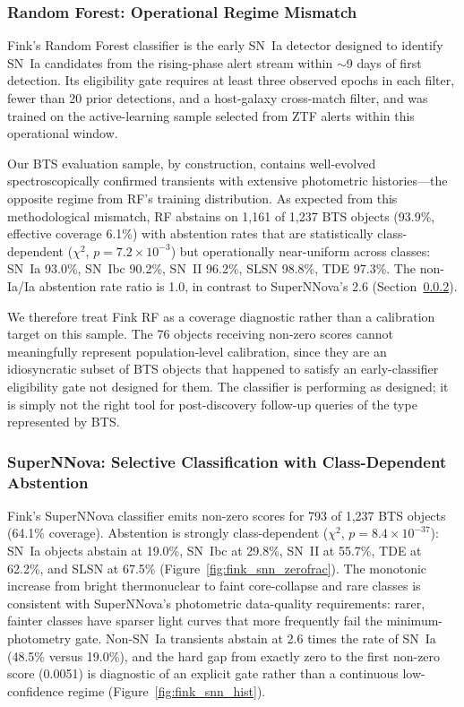 \documentclass[twocolumn]{aastex631}
\begin{document}
\subsubsection{Random Forest: Operational Regime Mismatch} \label{sec:fink_rf}

Fink's Random Forest classifier \citep{leoni2022} is the early SN~Ia detector designed to identify SN~Ia candidates from the rising-phase alert stream within $\sim$9 days of first detection. Its eligibility gate requires at least three observed epochs in each filter, fewer than 20 prior detections, and a host-galaxy cross-match filter, and was trained on the active-learning sample selected from ZTF alerts within this operational window.

Our BTS evaluation sample, by construction, contains well-evolved spectroscopically confirmed transients with extensive photometric histories---the opposite regime from RF's training distribution. As expected from this methodological mismatch, RF abstains on 1,161 of 1,237 BTS objects (93.9\%, effective coverage 6.1\%) with abstention rates that are statistically class-dependent ($\chi^2$, $p = 7.2 \times 10^{-3}$) but operationally near-uniform across classes: SN~Ia 93.0\%, SN~Ibc 90.2\%, SN~II 96.2\%, SLSN 98.8\%, TDE 97.3\%. The non-Ia/Ia abstention rate ratio is 1.0, in contrast to SuperNNova's 2.6 (Section~\ref{sec:fink_snn}).

We therefore treat Fink RF as a coverage diagnostic rather than a calibration target on this sample. The 76 objects receiving non-zero scores cannot meaningfully represent population-level calibration, since they are an idiosyncratic subset of BTS objects that happened to satisfy an early-classifier eligibility gate not designed for them. The classifier is performing as designed; it is simply not the right tool for post-discovery follow-up queries of the type represented by BTS.

\subsubsection{SuperNNova: Selective Classification with Class-Dependent Abstention} \label{sec:fink_snn}

Fink's SuperNNova classifier \citep{moller2020} emits non-zero scores for 793 of 1,237 BTS objects (64.1\% coverage). Abstention is strongly class-dependent ($\chi^2$, $p = 8.4 \times 10^{-37}$): SN~Ia objects abstain at 19.0\%, SN~Ibc at 29.8\%, SN~II at 55.7\%, TDE at 62.2\%, and SLSN at 67.5\% (Figure~\ref{fig:fink_snn_zerofrac}). The monotonic increase from bright thermonuclear to faint core-collapse and rare classes is consistent with SuperNNova's photometric data-quality requirements: rarer, fainter classes have sparser light curves that more frequently fail the minimum-photometry gate. Non-SN~Ia transients abstain at 2.6 times the rate of SN~Ia (48.5\% versus 19.0\%), and the hard gap from exactly zero to the first non-zero score (0.0051) is diagnostic of an explicit gate rather than a continuous low-confidence regime (Figure~\ref{fig:fink_snn_hist}).
\end{document}
